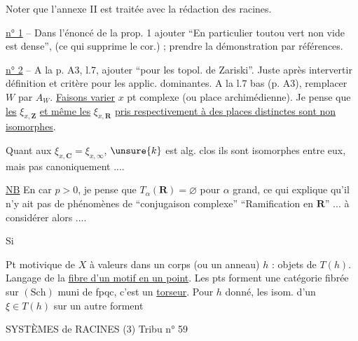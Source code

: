Noter que l'annexe II est traitée avec la rédaction des racines.

\uline{n° 1} -- Dans l'énoncé de la prop. 1 ajouter ``En particulier toutou vert non vide est dense'', (ce qui supprime le cor.) ; prendre la démonstration par références.

\uline{n° 2} -- A la p. A3, l.7, ajouter ``pour les topol. de Zariski''. Juste après intervertir définition et critère pour les applic. dominantes. A la l.7 bas (p. A3), remplacer $W$ par $A_W$.
\uline{Faisons varier} $x$ pt complexe (ou place archimédienne). Je pense que \uline{les} $\xi_{x,\mathbf Z}$ \uline{et même les} $\xi_{x,\mathbf R}$  \uline{pris respectivement à des places distinctes sont non isomorphes}.


Quant aux $\xi_{x,\mathbf C}=\xi_{x,\infty}$,    $\unsure{k}$ est  alg. clos ils sont isomorphes entre eux, mais pas canoniquement ....

\uline{NB} En car $p>0$, je pense que $T_\alpha(\mathbf R)=\varnothing$ pour $\alpha$ grand, ce qui explique qu'il n'y ait pas de phénomènes de ``conjugaison complexe'' ``Ramification en $\mathbf R$'' ... à considérer alors ....


Si


Pt motivique de $X$ à valeurs dans un corps (ou un anneau) $h$ : objets de $T(h)$. Langage de la \uline{fibre d'un motif en un point}. Les pts forment une catégorie fibrée sur $(\mathrm{Sch})$ muni de fpqc,  c'est un \uline{torseur}. Pour $h$ donné, les isom. d'un  $\xi\in T(h)$ sur un autre forment 

SYSTÈMES de RACINES (3) \hfill Tribu n° 59

